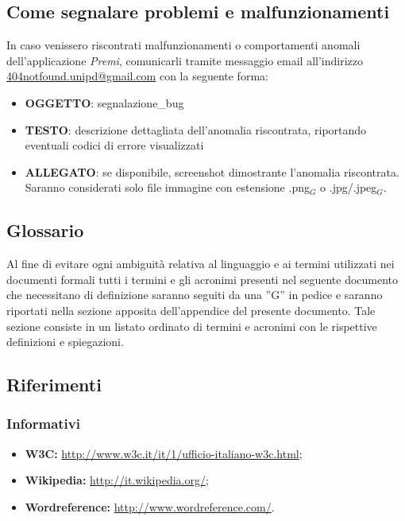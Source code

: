 \subsection{Come segnalare problemi e malfunzionamenti}
In caso venissero riscontrati malfunzionamenti o comportamenti anomali dell'applicazione \emph{Premi}, comunicarli tramite messaggio email all'indirizzo \href{mailto:404notfound.unipd@gmail.com}{404notfound.unipd@gmail.com} con la seguente forma:
\begin{itemize}
\item \textbf{OGGETTO}: segnalazione\_bug
\item \textbf{TESTO}: descrizione dettagliata dell'anomalia riscontrata, riportando eventuali codici di errore visualizzati
\item \textbf{ALLEGATO}: se disponibile, screenshot dimostrante l'anomalia riscontrata. Saranno considerati solo file immagine con estensione .png$_G$ o .jpg/.jpeg$_G$.
\end{itemize}

\subsection{Glossario}
Al fine di evitare ogni ambiguità relativa al linguaggio e ai termini utilizzati nei documenti formali tutti i termini e gli acronimi presenti nel seguente documento che necessitano di definizione saranno seguiti da una ”G” in pedice e saranno riportati nella sezione apposita dell'appendice del presente documento. Tale sezione consiste in un listato ordinato di termini e acronimi con le rispettive definizioni e spiegazioni.

\subsection{Riferimenti}
\subsubsection{Informativi}
\begin{itemize}
	\item \textbf{W3C:} \href{http://www.w3c.it/it/1/ufficio-italiano-w3c.html}{http://www.w3c.it/it/1/ufficio-italiano-w3c.html};
	\item \textbf{Wikipedia:} \href{http://it.wikipedia.org/}{http://it.wikipedia.org/}; 
	\item \textbf{Wordreference:} \href{http://www.wordreference.com/}{http://www.wordreference.com/}.
\end{itemize}

\newpage